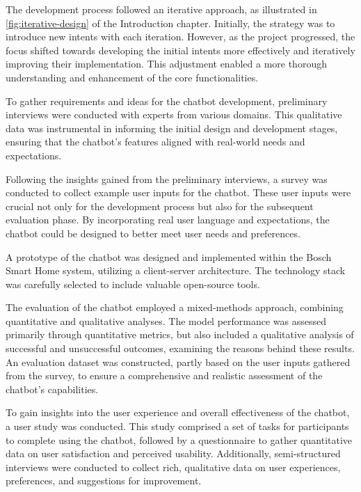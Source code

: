The development process followed an iterative approach, as illustrated in \cref{fig:iterative-design} of the Introduction chapter. Initially, the strategy was to introduce new intents with each iteration. However, as the project progressed, the focus shifted towards developing the initial intents more effectively and iteratively improving their implementation. This adjustment enabled a more thorough understanding and enhancement of the core functionalities.

To gather requirements and ideas for the chatbot development, preliminary interviews were conducted with experts from various domains. This qualitative data was instrumental in informing the initial design and development stages, ensuring that the chatbot's features aligned with real-world needs and expectations.

Following the insights gained from the preliminary interviews, a survey was conducted to collect example user inputs for the chatbot. These user inputs were crucial not only for the development process but also for the subsequent evaluation phase. By incorporating real user language and expectations, the chatbot could be designed to better meet user needs and preferences.

A prototype of the chatbot was designed and implemented within the Bosch Smart Home system, utilizing a client-server architecture. The technology stack was carefully selected to include valuable open-source tools.

The evaluation of the chatbot employed a mixed-methods approach, combining quantitative and qualitative analyses. The model performance was assessed primarily through quantitative metrics, but also included a qualitative analysis of successful and unsuccessful outcomes, examining the reasons behind these results. An evaluation dataset was constructed, partly based on the user inputs gathered from the survey, to ensure a comprehensive and realistic assessment of the chatbot's capabilities.

To gain insights into the user experience and overall effectiveness of the chatbot, a user study was conducted. This study comprised a set of tasks for participants to complete using the chatbot, followed by a questionnaire to gather quantitative data on user satisfaction and perceived usability. Additionally, semi-structured interviews were conducted to collect rich, qualitative data on user experiences, preferences, and suggestions for improvement.